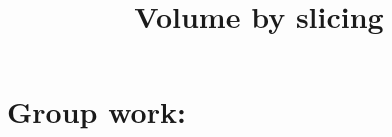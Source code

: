 \documentclass[noinstructornotes]{ximera}
\title{Volume by slicing}
\begin{document}
\begin{abstract}		\end{abstract}
\maketitle

\section{Group work:}
\end{document}

